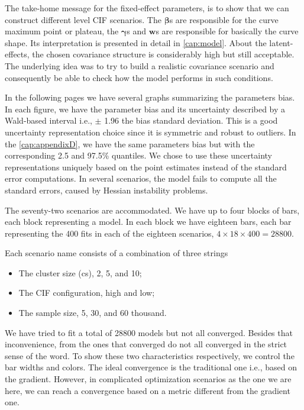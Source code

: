 The take-home message for the fixed-effect parameters, is to show that
we can construct different level CIF scenarios. The \(\bm{\beta}\)s are
responsible for the curve maximum point or plateau, the \(\bm{\gamma}\)s
and \(\bm{w}\)s are responsible for basically the curve shape. Its
interpretation is presented in detail in \autoref{cap:model}. About the
latent-effects, the chosen covariance structure is considerably high but
still acceptable. The underlying idea was to try to build a realistic
covariance scenario and consequently be able to check how the model
performs in such conditions.

In the following pages we have several graphs summarizing the parameters
bias. In each figure, we have the parameter bias and its uncertainty
described by a Wald-based interval i.e., \(\pm\) 1.96 the bias standard
deviation. This is a good uncertainty representation choice since it is
symmetric and robust to outliers. In the \autoref{cap:appendixD}, we
have the same parameters bias but with the corresponding 2.5 and 97.5\%
quantiles. We chose to use these uncertainty representations uniquely
based on the point estimates instead of the standard error
computations. In several scenarios, the model fails to compute all the
standard errors, caused by Hessian instability problems.

The seventy-two scenarios are accommodated. We have up to four blocks of
bars, each block representing a model. In each block we have eighteen
bars, each bar representing the 400 fits in each of the eighteen
scenarios, \(4 \times 18 \times 400 = 28800\). 

Each scenario name consists of a combination of three strings
\begin{itemize}
 \item The cluster size (cs), 2, 5, and 10;
 \item The CIF configuration, high and low;
 \item The sample size, 5, 30, and 60 thousand.
\end{itemize}
We have tried to fit a total of 28800 models but not all
converged. Besides that inconvenience, from the ones that converged do
not all converged in the strict sense of the word. To show these two
characteristics respectively, we control the bar widths and colors. The
ideal convergence is the traditional one i.e., based on the
gradient. However, in complicated optimization scenarios as the one we
are here, we can reach a convergence based on a metric different from
the gradient one.


